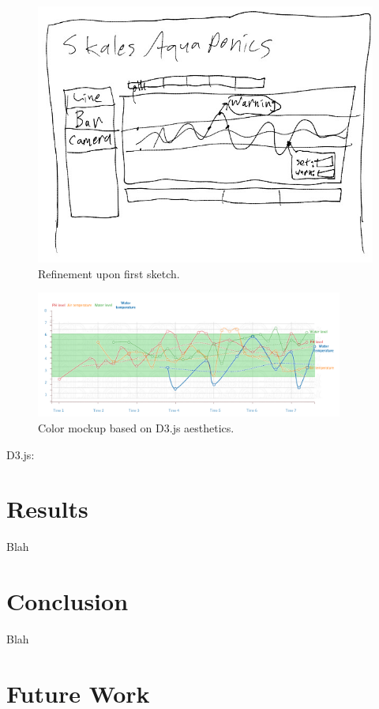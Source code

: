 \documentclass{sigchi}
\begin{document}
\begin{figure}[!h]
\centering
\includegraphics[width=0.9\columnwidth]{Sketch2}
\caption{Refinement upon first sketch.}
\label{fig:sketch2}
\end{figure}

\begin{figure}[!h]
\centering
\includegraphics[width=0.9\textwidth]{Mockup}
\caption{Color mockup based on D3.js aesthetics.}
\label{fig:mockup}
\end{figure}

D3.js: \cite{d3js}
 
\section{Results}

Blah

\section{Conclusion}

Blah

\section{Future Work}
\end{document}
